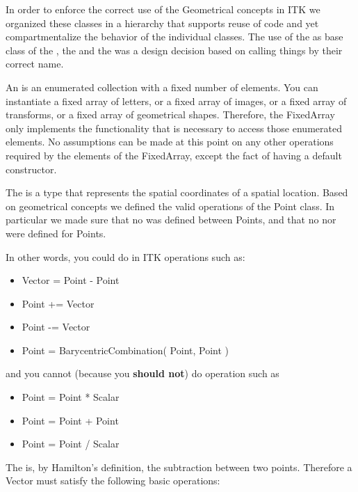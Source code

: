 In order to enforce the correct use of the Geometrical concepts in ITK we
organized these classes in a hierarchy that supports reuse of code and yet
compartmentalize the behavior of the individual classes.  The use of the
 as base class of the , the 
and the  was a design decision based on calling things
by their correct name.

An  is an enumerated collection with a fixed number of
elements. You can instantiate a fixed array of letters, or a fixed array of
images, or a fixed array of transforms, or a fixed array of geometrical shapes.
Therefore, the FixedArray only implements the functionality that is necessary to
access those enumerated elements. No assumptions can be made at this point on
any other operations required by the elements of the FixedArray, except the
fact of having a default constructor.

The  is a type that represents the spatial coordinates of a
spatial location. Based on geometrical concepts we defined the valid operations
of the Point class. In particular we made sure that no  was
defined between Points, and that no  nor
 were defined for Points.

In other words, you could do in ITK operations such as:

\begin{itemize}
\item Vector  = Point - Point
\item Point  +=  Vector
\item Point  -=  Vector
\item Point  = BarycentricCombination( Point, Point )
\end{itemize}

and you cannot (because you \textbf{should not}) do operation such as

\begin{itemize}
\item Point = Point * Scalar    
\item Point = Point + Point    
\item Point = Point / Scalar  
\end{itemize}

The  is, by Hamilton's definition, the subtraction between two
points. Therefore a Vector must satisfy the following basic operations:

